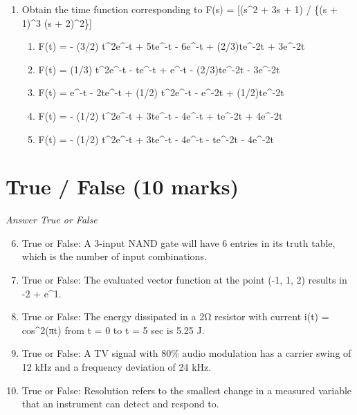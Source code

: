 \documentclass[12pt]{article}
\begin{document}
\begin{enumerate}[label=\arabic*.]
\begin{enumerate}[label=(\alph*)]
    \item F(s) = [(3 / 4) / (s + 1)] - [(1 / 8) / (s + 1)\^{}2] - [(5 / 8) / (s + 3)]
    \item F(s) = [(1 / 2) / (s + 1)\^{}2] + [(1 / 4) / (s + 1)] - [(1 / 4) / (s + 3)]
    \item F(s) = [(1 / 6) / (s + 1)] + [(1 / 3) / (s + 1)\^{}2] - [(1 / 2) / (s + 3)]
\end{enumerate}
\item Obtain the time function corresponding to F(s) = [(s\^{}2 + 3s + 1) / \{(s + 1)\^{}3 (s + 2)\^{}2\}]
\begin{enumerate}[label=(\alph*)]
    \item F(t) = - (3/2) t\^{}2e\^{}-t + 5te\^{}-t - 6e\^{}-t + (2/3)te\^{}-2t + 3e\^{}-2t
    \item F(t) = (1/3) t\^{}2e\^{}-t - te\^{}-t + e\^{}-t - (2/3)te\^{}-2t - 3e\^{}-2t
    \item F(t) = e\^{}-t - 2te\^{}-t + (1/2) t\^{}2e\^{}-t - e\^{}-2t + (1/2)te\^{}-2t
    \item F(t) = - (1/2) t\^{}2e\^{}-t + 3te\^{}-t - 4e\^{}-t + te\^{}-2t + 4e\^{}-2t
    \item F(t) = - (1/2) t\^{}2e\^{}-t + 3te\^{}-t - 4e\^{}-t - te\^{}-2t - 4e\^{}-2t
\end{enumerate}
\end{enumerate}

\section*{True / False (10 marks)}
\textit{Answer True or False}
\begin{enumerate}[label=\arabic*.]
\setcounter{enumi}{5}
\item True or False: A 3-input NAND gate will have 6 entries in its truth table, which is the number of input combinations.
\item True or False: The evaluated vector function at the point (-1, 1, 2) results in -2 + e\^{}1.
\item True or False: The energy dissipated in a 2Ω resistor with current i(t) = cos\^{}2(πt) from t = 0 to t = 5 sec is 5.25 J.
\item True or False: A TV signal with 80\% audio modulation has a carrier swing of 12 kHz and a frequency deviation of 24 kHz.
\item True or False: Resolution refers to the smallest change in a measured variable that an instrument can detect and respond to.
\end{enumerate}
\end{document}
